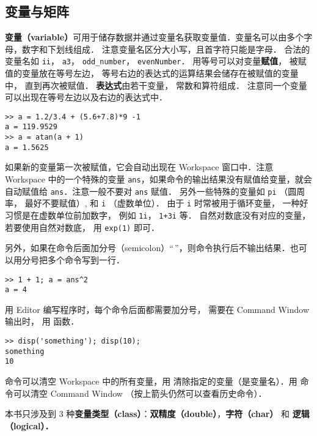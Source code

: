 

\subsection{变量与矩阵}
\textbf{变量（variable）}可用于储存数据并通过变量名获取变量值．变量名可以由多个字母，数字和下划线组成． 注意变量名区分大小写，且首字符只能是字母． 合法的变量名如 \lstinline|ii|， \lstinline|a3|， \lstinline|odd_number|， \lstinline|evenNumber|． 用等号可以对变量\textbf{赋值}， 被赋值的变量放在等号左边， 等号右边的表达式的运算结果会储存在被赋值的变量中， 直到再次被赋值． \textbf{表达式}由若干变量， 常数和算符组成． 注意同一个变量可以出现在等号左边以及右边的表达式中．
\begin{lstlisting}[language=MatlabCom]
>> a = 1.2/3.4 + (5.6+7.8)*9 -1
a = 119.9529
>> a = atan(a + 1)
a = 1.5625
\end{lstlisting}
如果新的变量第一次被赋值，它会自动出现在 Workspace 窗口中．注意 Workspace 中的一个特殊的变量 \lstinline|ans|，如果命令的输出结果没有赋值给变量，就会自动赋值给 \lstinline|ans|．注意一般不要对 \lstinline|ans| 赋值． 另外一些特殊的变量如 \lstinline|pi| （圆周率， 最好不要赋值）, 和 \lstinline|i| （虚数单位）． 由于 \lstinline|i| 时常被用于循环变量， 一种好习惯是在虚数单位前加数字， 例如 \lstinline|1i|， \lstinline|1+3i| 等． 自然对数底没有对应的变量， 若要使用自然对数底， 用 \lstinline|exp(1)| 即可．

另外，如果在命令后面加分号（semicolon）“\,\x{;}”，则命令执行后不输出结果．也可以用分号把多个命令写到一行．
\begin{lstlisting}[language=MatlabCom]
>> 1 + 1; a = ans^2
a = 4
\end{lstlisting}
用 Editor 编写程序时，每个命令后面都需要加分号， 需要在 Command Window 输出时， 用  函数．
\begin{lstlisting}[language=MatlabCom]
>> disp('something'); disp(10);
something
10
\end{lstlisting}

 命令可以清空 Workspace 中的所有变量，用  清除指定的变量（是变量名）．用  命令可以清空 Command Window （按上箭头仍然可以查看历史命令）．

本书只涉及到 3 种\textbf{变量类型（class）}：\textbf{双精度（double）}，\textbf{字符（char）} 和 \textbf{逻辑（logical）．}

